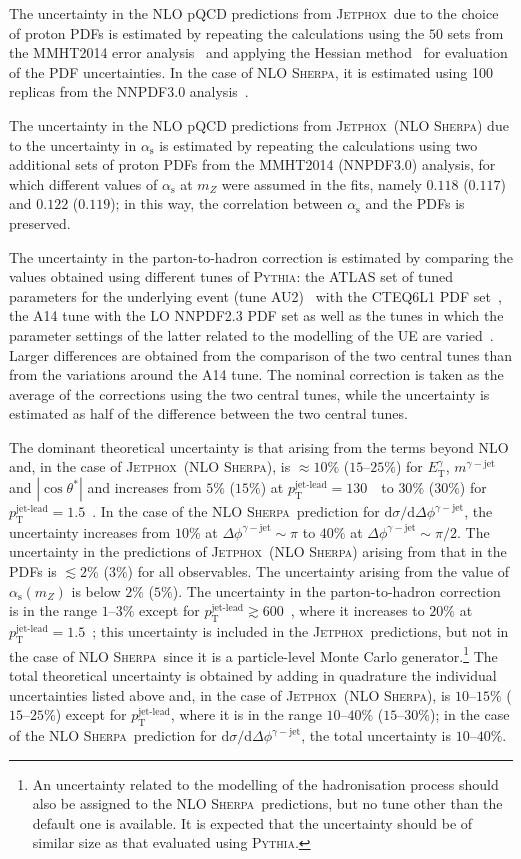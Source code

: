 \documentclass[cernpreprint,texlive=2016,txfonts,UKenglish]{latex/atlasdoc}
\def\ptjetl{p_{\mathrm{T}}^{\text{jet-lead}}}
\def\etg{E_{\mathrm{T}}^{\gamma}}
\def\mgj{m^{\gamma-{\mathrm{jet}}}}
\def\ctgj{\cos\theta^*}
\def\deltaphigj{\Delta\phi^{\gamma-{\mathrm{jet}}}}
\def\dsphi{{\mathrm{d}}\sigma/{\mathrm{d}}\deltaphigj}
\def\mz{m_Z}
\def\as{\alpha_{\mathrm{s}}}
\def\asz{\alpha_{\mathrm{s}}(\mz)}
\def\sher{{\textsc{Sherpa}}}
\def\pyt{{\textsc{Pythia}}}
\def\jetp{{\textsc{Jetphox}}}
\begin{document}
The uncertainty in the NLO pQCD predictions from \jetp\ due to the
choice of proton PDFs is estimated by repeating the calculations using
the $50$ sets from the MMHT2014 error analysis~\cite{epj:c75:204} and
applying the Hessian method~\cite{pr:d65:014013} for evaluation of the
PDF uncertainties. In the case of NLO \sher, it is estimated using 100
replicas from the NNPDF3.0 analysis~\cite{jhep:1504:040}.

The uncertainty in the NLO pQCD predictions from \jetp\ (NLO \sher)
due to the uncertainty in $\as$ is estimated by repeating the
calculations using two additional sets of proton PDFs from the
MMHT2014 (NNPDF3.0) analysis, for which different values of $\as$ at
$\mz$ were assumed in the fits, namely $0.118$ ($0.117$) and $0.122$
($0.119$); in this way, the correlation between $\as$ and the PDFs is
preserved.

The uncertainty in the parton-to-hadron correction is estimated by
comparing the values obtained using different tunes of \pyt: the ATLAS
set of tuned parameters for the underlying event (tune
AU2)~\cite{ATL-PHYS-PUB-2012-003} with the CTEQ6L1 PDF
set~\cite{jhep:0207:012}, the A14 tune with the LO NNPDF2.3 PDF set as
well as the tunes in which the parameter settings of the latter
related to the modelling of the UE are
varied~\cite{ATL-PHYS-PUB-2014-021}. Larger differences are obtained
from the comparison of the two central tunes than from the variations
around the A14 tune. The nominal correction is taken as the average of
the corrections using the two central tunes, while the uncertainty is
estimated as half of the difference between the two central tunes.

The dominant theoretical uncertainty is that arising from the terms
beyond NLO and, in the case of \jetp\ (NLO \sher), is $\approx 10\%$
($15$--$25\%$) for $\etg$, $\mgj$ and $|\ctgj|$ and increases from
$5\%$ ($15\%$) at $\ptjetl=130$~\GeV\ to $30\%$ ($30\%$) for
$\ptjetl=1.5$~\TeV. In the case of the NLO \sher\ prediction for
$\dsphi$, the uncertainty increases from $10\%$ at
$\deltaphigj\sim\pi$ to $40\%$ at $\deltaphigj\sim\pi/2$. The
uncertainty in the predictions of \jetp\ (NLO \sher) arising from that
in the PDFs is $\lesssim 2\%$ ($3\%$) for all observables. The
uncertainty arising from the value of $\asz$ is below $2\%$ ($5\%$).
The uncertainty in the parton-to-hadron correction is in the range
$1$--$3\%$ except for $\ptjetl\gtrsim 600$~\GeV, where it increases to
$20\%$ at $\ptjetl = 1.5$~\TeV; this uncertainty is included in the
\jetp\ predictions, but not in the case of  NLO \sher\ since it is a
particle-level Monte Carlo generator.\footnote{An uncertainty related
  to the modelling of the hadronisation process should also be
  assigned to the NLO \sher\ predictions, but no tune other than the
  default one is available. It is expected that the uncertainty should
  be of similar size as that evaluated using \pyt.} The total
theoretical uncertainty is obtained by adding in quadrature the
individual uncertainties listed above and, in the case of \jetp\ (NLO
\sher), is $10$--$15\%$ ($15$--$25\%$) except for $\ptjetl$, where it
is in the range $10$--$40\%$ ($15$--$30\%$); in the case of the NLO
\sher\ prediction for $\dsphi$, the total uncertainty is
$10$--$40\%$.
\end{document}
